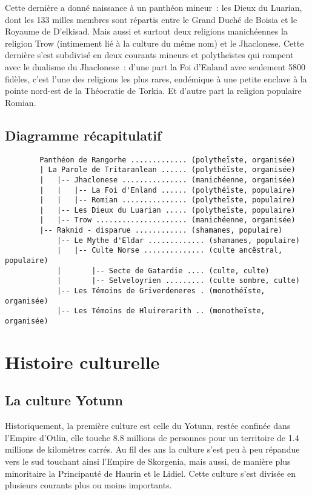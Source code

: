 \documentclass[french, a4paper, 12pt]{article}
\begin{document}
	Cette dernière a donné naissance à un panthéon mineur~: les Dieux du Luarian, dont les 133 milles membres sont répartis entre le Grand Duché de Boisia et le Royaume de D'elkisad. Mais aussi et surtout deux religions manichéennes la religion Trow (intimement lié à la culture du même nom) et le Jhaclonese. Cette dernière s'est subdivisé en deux courants mineurs et polytheïstes qui rompent avec le dualisme du Jhaclonese~: d'une part la Foi d'Enland avec seulement 5800 fidèles, c'est l'une des religions les plus rares, endémique à une petite enclave à la pointe nord-est de la Théocratie de Torkia. Et d'autre part la religion populaire Romian.

	\subsection{Diagramme récapitulatif}

	\begin{verbatim}
		Panthéon de Rangorhe ............. (polytheïste, organisée)
		| La Parole de Tritaranlean ...... (polythéïste, organisée)
		|   |-- Jhaclonese ............... (manichéenne, organisée)
		|   |   |-- La Foi d'Enland ...... (polythéïste, populaire)
		|   |   |-- Romian ............... (polytheïste, populaire)
		|   |-- Les Dieux du Luarian ..... (polytheïste, populaire)
		|   |-- Trow ..................... (manichéenne, organisée)
		|-- Raknid - disparue ............ (shamanes, populaire)
			|-- Le Mythe d'Eldar ............. (shamanes, populaire)
			|   |-- Culte Norse .............. (culte ancêstral, populaire)
			|       |-- Secte de Gatardie .... (culte, culte)
			|       |-- Selveloyrien ......... (culte sombre, culte)
			|-- Les Témoins de Griverdeneres . (monothéïste, organisée)
			|-- Les Témoins de Hluirerarith .. (monotheïste, organisée)
	\end{verbatim}

\section{Histoire culturelle}

	\subsection{La culture Yotunn}

		Historiquement, la première culture est celle du Yotunn, restée confinée dans l'Empire d'Otlin, elle touche 8.8 millions de personnes pour un territoire de 1.4 millions de kilomètres carrés. Au fil des ans la culture s'est peu à peu répandue vers le sud touchant ainsi l'Empire de Skorgenia, mais aussi, de manière plus minoritaire la Principauté de Haurin et le Lidiel. Cette culture s'est divisée en plusieurs courants plus ou moins importants.
\end{document}

